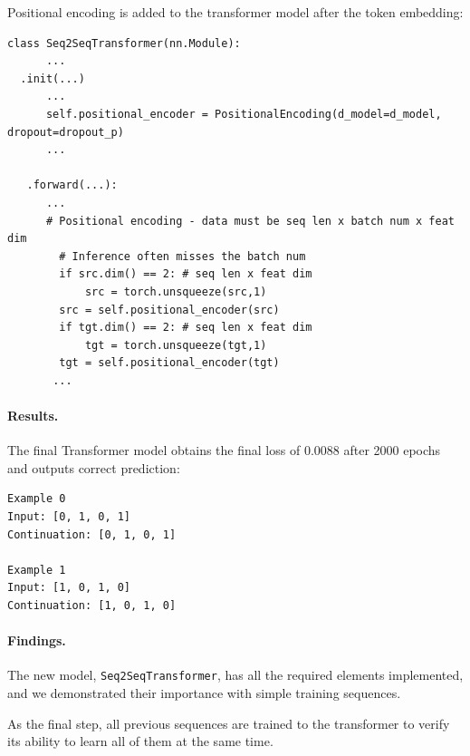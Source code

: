 \documentclass[final]{article}
\begin{document}
Positional encoding is added to the transformer model after the token embedding:
\begin{lstlisting}
class Seq2SeqTransformer(nn.Module):
      ...
  .init(...)
      ...
      self.positional_encoder = PositionalEncoding(d_model=d_model, dropout=dropout_p)
      ...
      
   .forward(...):
      ...
      # Positional encoding - data must be seq len x batch num x feat dim
        # Inference often misses the batch num
        if src.dim() == 2: # seq len x feat dim
            src = torch.unsqueeze(src,1) 
        src = self.positional_encoder(src)
        if tgt.dim() == 2: # seq len x feat dim
            tgt = torch.unsqueeze(tgt,1) 
        tgt = self.positional_encoder(tgt)
       ...
\end{lstlisting}


\paragraph{Results.} The final Transformer model obtains the final loss of 0.0088 after 2000 epochs and outputs correct prediction:
\begin{verbatim}
Example 0
Input: [0, 1, 0, 1]
Continuation: [0, 1, 0, 1]

Example 1
Input: [1, 0, 1, 0]
Continuation: [1, 0, 1, 0]
\end{verbatim}

\paragraph{Findings.} The new model, \texttt{Seq2SeqTransformer}, has all the required elements implemented, and we demonstrated their importance with simple training sequences.

As the final step, all previous sequences are trained to the transformer to verify its ability to learn all of them at the same time.
\end{document}
